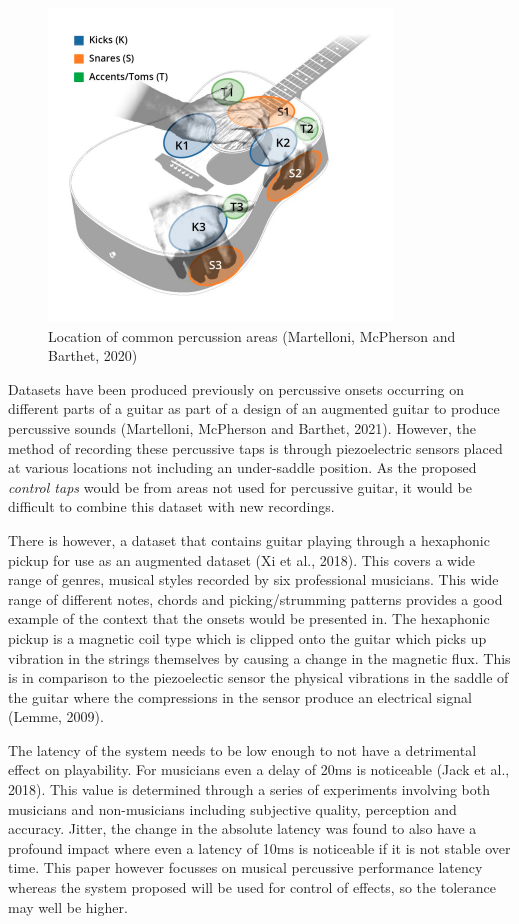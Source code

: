 \documentclass[conference]{IEEEtran}
\begin{document}
\begin{figure}[htbp]
    \centerline{\includegraphics[scale=0.4]{percussion-areas.png}}
    \caption{Location of common percussion areas (Martelloni, McPherson and Barthet, 2020)}
    \label{percussion-areas}
    \end{figure}

Datasets have been produced previously on percussive onsets occurring on different parts of a guitar as part of a design of an augmented guitar to produce percussive sounds (Martelloni, McPherson and Barthet, 2021). However, the method of recording these percussive taps is through piezoelectric sensors placed at various locations not
including an under-saddle position. As the proposed \emph{control taps} would be from areas not used for percussive guitar, it would be difficult to combine this dataset with new recordings.

There is however, a dataset that contains guitar playing through a hexaphonic pickup for use as an augmented dataset (Xi et al., 2018). This covers a wide range of genres, musical styles recorded by six professional musicians.
This wide range of different notes, chords and picking/strumming patterns provides a good example of the context that the onsets would be presented in. The hexaphonic pickup is a magnetic coil type which is clipped onto the guitar which picks
up vibration in the strings themselves by causing a change in the magnetic flux. This is in comparison to the piezoelectic sensor the physical vibrations in the saddle of the guitar where the compressions in the sensor produce an electrical signal (Lemme, 2009).

The latency of the system needs to be low enough to not have a detrimental effect on playability. For musicians even a delay of 20ms is noticeable (Jack et al., 2018). This value is determined through a series of experiments involving both musicians
and non-musicians including subjective quality, perception and accuracy. Jitter, the change in the absolute latency was found to also have a profound impact where even a latency of 10ms is noticeable if it is not stable over time. This paper however
focusses on musical percussive performance latency whereas the system proposed will be used for control of effects, so the tolerance may well be higher.
\end{document}
